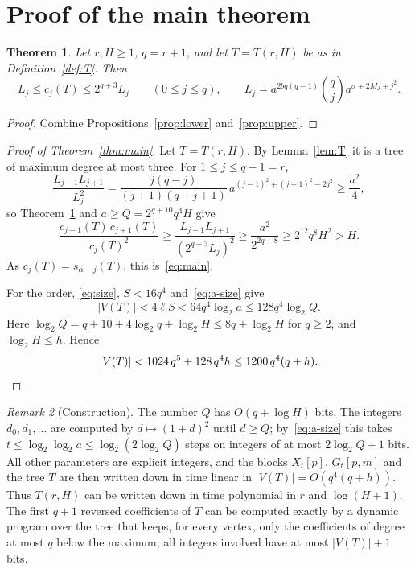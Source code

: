 \documentclass[11pt]{amsart}
\newtheorem{theorem}{Theorem}[section]
\theoremstyle{definition}
\theoremstyle{remark}
\newtheorem{remark}[theorem]{Remark}
\numberwithin{equation}{section}
\begin{document}
\section{Proof of the main theorem}\label{sec:proof}

\begin{theorem}\label{thm:two-sided}
Let $r,H\ge1$, $q=r+1$, and let $T=T(r,H)$ be as in Definition~\ref{def:T}. Then
\[
L_j\le c_j(T)\le2^{q+3}L_j\qquad(0\le j\le q),\qquad L_j=a^{2bq(q-1)}\binom qja^{\sigma+2Mj+j^2}.
\]
\end{theorem}

\begin{proof}
Combine Propositions~\ref{prop:lower} and~\ref{prop:upper}.
\end{proof}

\begin{proof}[Proof of Theorem~\ref{thm:main}]
Let $T=T(r,H)$. By Lemma~\ref{lem:T} it is a tree of maximum degree at most three. For $1\le j\le q-1=r$,
\[
\frac{L_{j-1}L_{j+1}}{L_j^2}=\frac{j(q-j)}{(j+1)(q-j+1)}\,a^{(j-1)^2+(j+1)^2-2j^2}\ge\frac{a^2}4,
\]
so Theorem~\ref{thm:two-sided} and $a\ge Q=2^{q+10}q^4H$ give
\[
\frac{c_{j-1}(T)\,c_{j+1}(T)}{c_j(T)^2}\ge\frac{L_{j-1}L_{j+1}}{(2^{q+3}L_j)^2}\ge\frac{a^2}{2^{2q+8}}\ge2^{12}q^8H^2>H.
\]
As $c_j(T)=s_{\alpha-j}(T)$, this is~\eqref{eq:main}.

For the order, \eqref{eq:size}, $S<16q^4$ and~\eqref{eq:a-size} give
\[
|V(T)|<4\ell S<64q^4\log_2a\le128q^4\log_2Q.
\]
Here $\log_2Q=q+10+4\log_2q+\log_2H\le8q+\log_2H$ for $q\ge2$, and $\log_2H\le h$. Hence
\[
|V(T)|<1024\,q^5+128\,q^4h\le1200\,q^4(q+h).\qedhere
\]
\end{proof}

\begin{remark}[Construction]\label{rem:complexity}
The number $Q$ has $O(q+\log H)$ bits. The integers $d_0,d_1,\dots$ are computed by $d\mapsto(1+d)^2$ until $d\ge Q$; by~\eqref{eq:a-size} this takes $t\le\log_2\log_2a\le\log_2(2\log_2Q)$ steps on integers of at most $2\log_2Q+1$ bits. All other parameters are explicit integers, and the blocks $X_t[p]$, $G_t[p,m]$ and the tree $T$ are then written down in time linear in $|V(T)|=O(q^4(q+h))$. Thus $T(r,H)$ can be written down in time polynomial in $r$ and $\log(H+1)$. The first $q+1$ reversed coefficients of $T$ can be computed exactly by a dynamic program over the tree that keeps, for every vertex, only the coefficients of degree at most $q$ below the maximum; all integers involved have at most $|V(T)|+1$ bits.
\end{remark}
\end{document}
